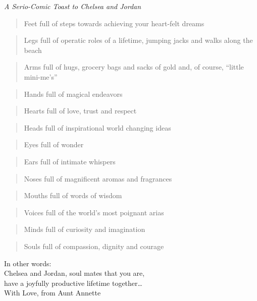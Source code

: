 {\centering
    \it A Serio-Comic Toast to Chelsea and Jordan\\
}

\bigskip

\begin{verse}
Feet full of steps towards achieving your heart-felt dreams
\end{verse}
\begin{verse}
Legs full of operatic roles of a lifetime, jumping jacks and walks along the beach
\end{verse}
\begin{verse}
Arms full of hugs, grocery bags and sacks of gold \textemdash and, of course, ``little mini-me's''
\end{verse}
\begin{verse}
Hands full of magical endeavors
\end{verse}
\begin{verse}
Hearts full of love, trust and respect
\end{verse}
\begin{verse}
Heads full of inspirational world changing ideas
\end{verse}
\begin{verse}
Eyes full of wonder
\end{verse}
\begin{verse}
Ears full of intimate whispers
\end{verse}
\begin{verse}
Noses full of magnificent aromas and fragrances
\end{verse}
\begin{verse}
Mouths full of words of wisdom
\end{verse}
\begin{verse}
Voices full of the world’s most poignant arias
\end{verse}
\begin{verse}
Minds full of curiosity and imagination
\end{verse}
\begin{verse}
Souls full of compassion, dignity and courage
\end{verse}

{\centering
    In other words:\\
    Chelsea and Jordan, soul mates that you are,\\
    have a joyfully productive lifetime together\ldots\\
    With Love, from Aunt Annette\\
}
